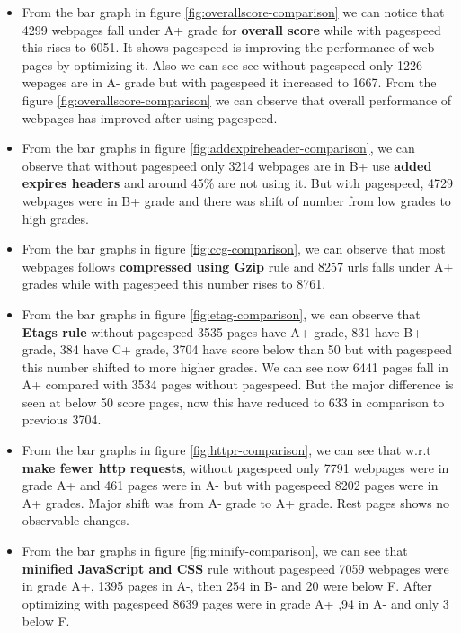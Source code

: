 \documentclass[conference]{IEEEtran}
\begin{document}
\begin{itemize}
\item From the bar graph in figure \ref{fig:overallscore-comparison} we can notice that 4299 webpages fall under
A+ grade for \textbf{overall score} while with pagespeed this rises to 6051. It
shows pagespeed is improving the performance of web pages by optimizing it. Also
we can see see without pagespeed only 1226 wepages are in A- grade but with
pagespeed it increased to 1667. From the figure \ref{fig:overallscore-comparison} we can observe that overall
performance of webpages has improved after using pagespeed.

\item From the bar graphs in figure \ref{fig:addexpireheader-comparison}, we can observe that without pagespeed only 3214
webpages are in B+  use \textbf{added expires headers} and around
45\% are not using it. But with pagespeed, 4729 webpages were in B+ grade and
there was shift of number from low grades to high grades.

\item From the bar graphs in figure \ref{fig:ccg-comparison}, we can observe that most webpages follows \textbf{compressed
using Gzip} rule and 8257 urls falls under A+ grades while with pagespeed this number rises to 8761.

\item From the bar graphs in figure \ref{fig:etag-comparison},
we can observe that \textbf{Etags rule} without pagespeed
3535 pages have A+ grade, 831 have B+ grade, 384 have C+ grade, 3704 have score
below than 50 but with pagespeed this number shifted to more higher grades. We can
see now 6441 pages fall in  A+ compared with 3534 pages without pagespeed. But the major difference is seen
at below 50 score pages, now this have reduced to 633 in comparison to previous
3704.

\item From the bar graphs in figure \ref{fig:httpr-comparison}, we can see that w.r.t \textbf{make fewer http
requests}, without pagespeed only 7791 webpages were in grade A+ and 461 pages
were in A- but with pagespeed 8202 pages were in A+ grades. Major shift was from 
A- grade to A+ grade. Rest pages shows no observable changes.

\item From the bar graphs in figure \ref{fig:minify-comparison}, we can see that \textbf{minified JavaScript and CSS} rule
without pagespeed 7059 webpages were in grade A+, 1395 pages in A-, then 254 in
B- and 20 were below F. After optimizing with pagespeed 8639 pages were in grade A+ ,94 in A- and only 3 below F.
\end{itemize}
\end{document}
